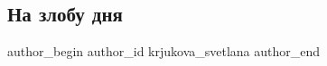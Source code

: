  
 
 
 
 
 
\subsection{На злобу дня}
\label{sec:20_01_2022.fb.krjukova_svetlana.1.na_zlobu_dnja_shevchenko}
 
\ifcmt
 author_begin
   author_id krjukova_svetlana
 author_end
\fi

